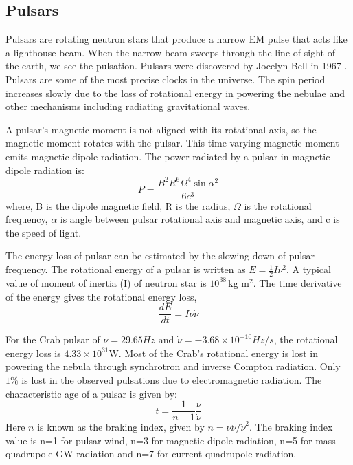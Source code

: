 \documentclass{ttuthes2007}
\begin{document}
\subsection{Pulsars}
Pulsars are rotating neutron stars that produce a narrow \ac{EM} pulse that
acts like a lighthouse beam. When the narrow beam sweeps through the line of sight of
the earth, we see the pulsation. Pulsars were discovered by Jocelyn Bell in 1967
. Pulsars are some of the most precise clocks in the
universe. The spin period increases slowly due to the loss of rotational energy
in powering the nebulae and other mechanisms including radiating gravitational waves. 

A pulsar's magnetic moment is not aligned with its rotational axis, so the
magnetic moment rotates with the pulsar. This time varying magnetic
moment emits magnetic dipole radiation. The power radiated by
a pulsar in magnetic dipole radiation is:
\begin{equation}
P= \frac{B^2R^6\Omega^4\sin{\alpha}^2}{6c^3}
\end{equation}
where, B is the dipole magnetic field, R is the radius, $\Omega$ is the rotational
frequency, $\alpha$ is angle between pulsar rotational axis and magnetic axis,
and c is the speed of light.  

The energy loss of pulsar can be estimated by the slowing down of pulsar
frequency. The rotational energy of a pulsar is written as $E=\frac{1}{2} I
\nu^2$. A
typical value of moment of inertia (I) of neutron star is $10^{38}$\,kg m$^2$. The
time derivative of the energy gives the rotational energy loss,
\begin{equation}
\frac{dE}{dt}= I\nu\dot{\nu}
\end{equation}

For the Crab pulsar of $\nu=29.65Hz$ and $\dot{\nu}= -3.68\times10^{-10}Hz/s$, the
rotational energy loss is $4.33\times10^{31}$W. Most of the Crab's rotational energy
is lost in powering the nebula through synchrotron and inverse Compton radiation.
Only $1\%$ is lost  in the observed pulsations due to electromagnetic radiation.
The characteristic age of a pulsar is given by:
\begin{equation}
t= \frac{1}{n-1}\frac{\nu}{\dot{\nu}}
\end{equation} 
Here $n$ is known as the braking index, given by $n=\nu\ddot{\nu}/\dot{\nu}^2$. 
The braking index value is n=1 for pulsar wind, n=3 for magnetic dipole
radiation, n=5 for mass quadrupole \ac{GW} radiation and n=7 for current
quadrupole radiation.
\end{document}

